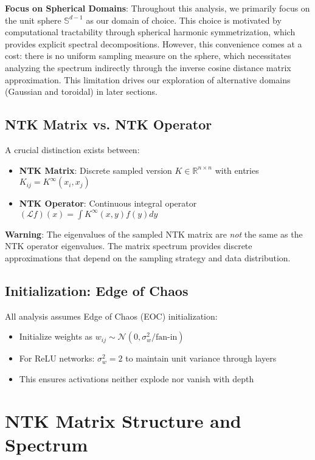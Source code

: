 \documentclass{article}
\begin{document}
\textbf{Focus on Spherical Domains}: Throughout this analysis, we primarily focus on the unit sphere $\mathbb{S}^{d-1}$ as our domain of choice. This choice is motivated by computational tractability through spherical harmonic symmetrization, which provides explicit spectral decompositions. However, this convenience comes at a cost: there is no uniform sampling measure on the sphere, which necessitates analyzing the spectrum indirectly through the inverse cosine distance matrix approximation. This limitation drives our exploration of alternative domains (Gaussian and toroidal) in later sections.

\subsection{NTK Matrix vs. NTK Operator}

A crucial distinction exists between:
\begin{itemize}
\item \textbf{NTK Matrix}: Discrete sampled version $K \in \mathbb{R}^{n \times n}$ with entries $K_{ij} = K^{\infty}(x_i, x_j)$
\item \textbf{NTK Operator}: Continuous integral operator $(\mathcal{L}f)(x) = \int K^{\infty}(x,y)f(y)dy$
\end{itemize}

\textbf{Warning}: The eigenvalues of the sampled NTK matrix are \emph{not} the same as the NTK operator eigenvalues. The matrix spectrum provides discrete approximations that depend on the sampling strategy and data distribution.

\subsection{Initialization: Edge of Chaos}

All analysis assumes Edge of Chaos (EOC) initialization:
\begin{itemize}
\item Initialize weights as $w_{ij} \sim \mathcal{N}(0, \sigma_w^2/\text{fan-in})$ 
\item For ReLU networks: $\sigma_w^2 = 2$ to maintain unit variance through layers
\item This ensures activations neither explode nor vanish with depth
\end{itemize}

\newpage

\section{NTK Matrix Structure and Spectrum}
\end{document}
